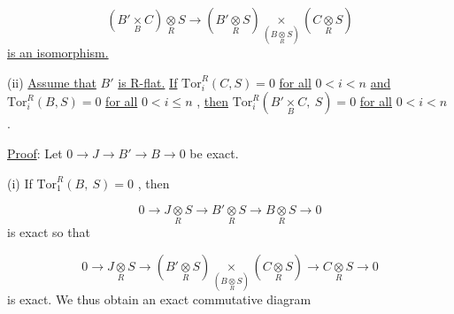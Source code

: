 \begin{equation*}
(B'\underset{B}{\times} C) \underset{R}{\otimes} S \to (B'\underset{R}{\otimes} S) \underset{(B \underset{R}{\otimes} S)}{\times} (C \underset{R}{\otimes} S)
\end{equation*}
\underline{is an isomorphism.}

(ii)  \underline{Assume that}  $B'$  \underline{is R-flat.} \underline{If}  $\mathrm{Tor}^{R}_{i}(C,S) = 0$  \underline{for all}  $0 < i < n$  \underline{and}  $\mathrm{Tor}^{R}_{i}(B,S) = 0$  \underline{for all}  $0 < i \leq n$  , \underline{then}  $\mathrm{Tor}^{R}_{i}(B'\underset{B}{\times}C,\ S) = 0$  \underline{for all}  $0 < i < n$  .

\underline{Proof}:  Let  $0 \to J \to B' \to B \to 0$  be exact.

(i)  If  $\mathrm{Tor}^{R}_{1}(B,\ S) = 0$  , then

\begin{equation*}
0 \to J\underset{R}{\otimes}S \to B'\underset{R}{\otimes}S \to B\underset{R}{\otimes}S \to 0
\end{equation*}
is exact so that

\begin{equation*}
0 \to J\underset{R}{\otimes}S \to (B'\underset{R}{\otimes}S) \underset{(B\underset{R}{\otimes}S)}{\times} (C\underset{R}{\otimes}S) \to C\underset{R}{\otimes}S \to 0
\end{equation*}
is exact. We thus obtain an exact commutative diagram



